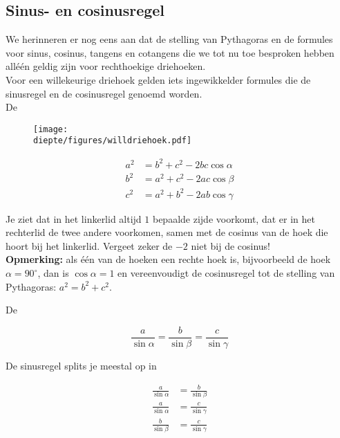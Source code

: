 \documentclass[a4paper,12pt]{article}
\newcommand{\diepte}{./}
\begin{document}
\subsection{Sinus- en cosinusregel}

We herinneren er nog eens aan dat de stelling van Pythagoras en de formules voor sinus, cosinus, tangens en cotangens die we tot nu toe besproken hebben all\'{e}\'{e}n geldig zijn voor rechthoekige driehoeken.\\ Voor een willekeurige driehoek gelden iets ingewikkelder formules die de sinusregel en de cosinusregel genoemd worden.\\

De 

\begin{figure}[h]
\begin{center}
\texttt{[image: \\diepte/figures/willdriehoek.pdf]}
\end{center}
\end{figure}

\begin{framed}
\begin{align*}
a^2&= b^2+c^2-2bc\cos \alpha\\
b^2&=a^2 + c^2 - 2ac\cos \beta\\
c^2&= a^2 + b^2 -2ab \cos \gamma
\end{align*}
\end{framed}

Je ziet dat in het linkerlid altijd $1$ bepaalde zijde voorkomt, dat er in het rechterlid de twee andere voorkomen, samen met de cosinus van de hoek die hoort bij het linkerlid. Vergeet zeker de $-2$ niet bij de cosinus!\\

{\bf Opmerking:} als \'{e}\'{e}n van de hoeken een rechte hoek is, bijvoorbeeld de hoek $\alpha=90^\circ$, dan is $\cos \alpha =1$ en vereenvoudigt de cosinusregel tot de stelling van Pythagoras: $a^2=b^2 +c^2$.

De 

\begin{framed}
\[\frac{a}{\sin \alpha}=\frac{b}{\sin \beta}=\frac{c}{\sin \gamma}\]
\end{framed}

De sinusregel splits je meestal op in
\begin{framed}
\begin{align*}
\frac{a}{\sin \alpha} &= \frac{b}{\sin \beta}\\
\frac{a}{\sin \alpha} &= \frac{c}{\sin \gamma}\\
\frac{b}{\sin \beta} &= \frac{c}{\sin \gamma}
\end{align*}
\end{framed}
\end{document}
